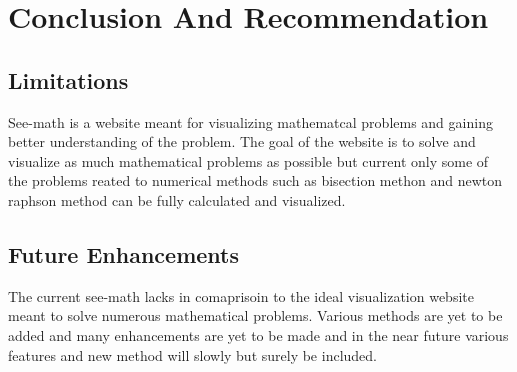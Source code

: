 \chapter{Conclusion And Recommendation}

\section{{\bf{Limitations}}}
\noindent
See-math is a website meant for visualizing mathematcal problems and gaining better understanding of the problem. The goal of the website is to solve and visualize as much mathematical problems as possible but current only some of the problems reated to numerical methods such as bisection methon and newton raphson method can be fully calculated and visualized.

\section{{\bf{Future Enhancements}}}
\noindent
The current see-math lacks in comaprisoin to the ideal visualization website meant to solve numerous mathematical problems. Various methods are yet to be added and many enhancements are yet to be made and in the near future various features and new method will slowly but surely be included.

